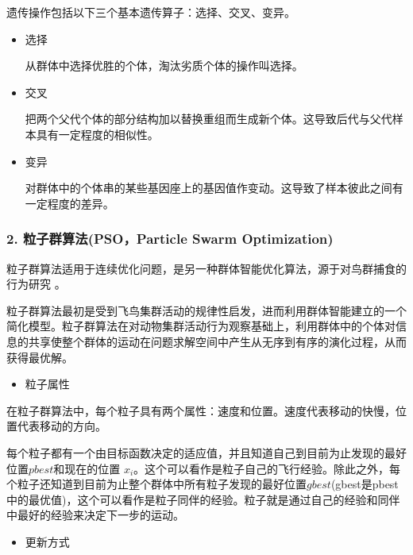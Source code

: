 \documentclass[letterpaper,10pt,english]{sphinxmanual}
\begin{document}
\sphinxAtStartPar
遗传操作包括以下三个基本遗传算子：选择、交叉、变异。
\begin{itemize}
\item {} 
\sphinxAtStartPar
选择

\sphinxAtStartPar
从群体中选择优胜的个体，淘汰劣质个体的操作叫选择。

\item {} 
\sphinxAtStartPar
交叉

\sphinxAtStartPar
把两个父代个体的部分结构加以替换重组而生成新个体。这导致后代与父代样本具有一定程度的相似性。

\item {} 
\sphinxAtStartPar
变异

\sphinxAtStartPar
对群体中的个体串的某些基因座上的基因值作变动。这导致了样本彼此之间有一定程度的差异。

\end{itemize}


\subsubsection{2. 粒子群算法(PSO，Particle Swarm Optimization)}
\label{\detokenize{_u7b80_u4ecb/_u6838_u5fc3_u8bbe_u8ba1_u4f18_u5316_u7b97_u6cd5/_u5168_u5c40_u641c_u7d22_u4f18_u5316_u6a21_u5757/_u5168_u5c40_u4f18_u5316_u7b97_u6cd5:pso-particle-swarm-optimization}}
\sphinxAtStartPar
粒子群算法适用于连续优化问题，是另一种群体智能优化算法，源于对鸟群捕食的行为研究 。

\sphinxAtStartPar
粒子群算法最初是受到飞鸟集群活动的规律性启发，进而利用群体智能建立的一个简化模型。粒子群算法在对动物集群活动行为观察基础上，利用群体中的个体对信息的共享使整个群体的运动在问题求解空间中产生从无序到有序的演化过程，从而获得最优解。
\begin{itemize}
\item {} 
\sphinxAtStartPar
粒子属性

\end{itemize}

\sphinxAtStartPar
在粒子群算法中，每个粒子具有两个属性：速度和位置。速度代表移动的快慢，位置代表移动的方向。

\sphinxAtStartPar
每个粒子都有一个由目标函数决定的适应值，并且知道自己到目前为止发现的最好位置\(pbest\)和现在的位置 \(x_i\)。这个可以看作是粒子自己的飞行经验。除此之外，每个粒子还知道到目前为止整个群体中所有粒子发现的最好位置\(gbest\)(gbest是pbest中的最优值)，这个可以看作是粒子同伴的经验。粒子就是通过自己的经验和同伴中最好的经验来决定下一步的运动。
\begin{itemize}
\item {} 
\sphinxAtStartPar
更新方式

\end{itemize}
\end{document}

